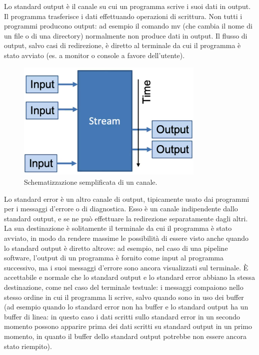 \documentclass[11pt]{book}
\begin{document}
Lo standard output è il canale su cui un programma scrive i suoi dati in output. Il programma trasferisce i dati effettuando operazioni di scrittura. Non tutti i programmi producono output: ad esempio il comando mv (che cambia il nome di un file o di una directory) normalmente non produce dati in output.
Il flusso di output, salvo casi di redirezione, è diretto al terminale da cui il programma è stato avviato (es. a monitor o console a favore dell'utente). 

\begin{figure}
	\centering
	\includegraphics[width=0.8\textwidth]{img/streams.png}
	\caption{Schematizzazione semplificata di un canale.}
	\label{fig:streams}
\end{figure}

Lo standard error è un altro canale di output, tipicamente usato dai programmi per i messaggi d'errore o di diagnostica. Esso è un canale indipendente dallo standard output, e se ne può effettuare la redirezione separatamente dagli altri. La sua destinazione è solitamente il terminale da cui il programma è stato avviato, in modo da rendere massime le possibilità di essere visto anche quando lo standard output è diretto altrove: ad esempio, nel caso di una pipeline software, l'output di un programma è fornito come input al programma successivo, ma i suoi messaggi d'errore sono ancora visualizzati sul terminale.
È accettabile e normale che lo standard output e lo standard error abbiano la stessa destinazione, come nel caso del terminale testuale: i messaggi compaiono nello stesso ordine in cui il programma li scrive, salvo quando sono in uso dei buffer (ad esempio quando lo standard error non ha buffer e lo standard output ha un buffer di linea: in questo caso i dati scritti sullo standard error in un secondo momento possono apparire prima dei dati scritti su standard output in un primo momento, in quanto il buffer dello standard output potrebbe non essere ancora stato riempito). 
\end{document}

